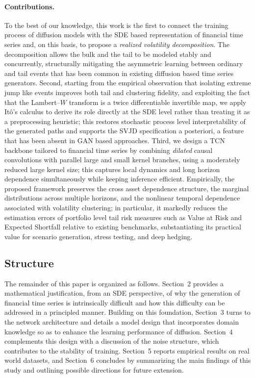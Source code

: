 \documentclass[sigconf,natbib=false]{acmart}
\begin{document}
\paragraph{Contributions.}
To the best of our knowledge, this work is the first to connect the training process of diffusion models with the SDE based representation of financial time series and, on this basis, to propose a \emph{realized volatility decomposition}. The decomposition allows the bulk and the tail to be modeled stably and concurrently, structurally mitigating the asymmetric learning between ordinary and tail events that has been common in existing diffusion based time series generators. Second, starting from the empirical observation that isolating extreme jump like events improves both tail and clustering fidelity, and exploiting the fact that the Lambert--$W$ transform is a twice differentiable invertible map, we apply It\^{o}'s calculus to derive its role directly at the SDE level rather than treating it as a preprocessing heuristic; this restores stochastic process level interpretability of the generated paths and supports the SVJD specification a posteriori, a feature that has been absent in GAN based approaches. Third, we design a TCN backbone tailored to financial time series by combining \emph{dilated} causal convolutions with parallel large and small kernel branches, using a moderately reduced large kernel size; this captures local dynamics and long horizon dependence simultaneously while keeping inference efficient. Empirically, the proposed framework preserves the cross asset dependence structure, the marginal distributions across multiple horizons, and the nonlinear temporal dependence associated with volatility clustering; in particular, it markedly reduces the estimation errors of portfolio level tail risk measures such as Value at Risk and Expected Shortfall relative to existing benchmarks, substantiating its practical value for scenario generation, stress testing, and deep hedging.



\subsection{Structure}

The remainder of this paper is organized as follows. Section~2 provides a mathematical justification, from an SDE perspective, of why the generation of financial time series is intrinsically difficult and how this difficulty can be addressed in a principled manner. Building on this foundation, Section~3 turns to the network architecture and details a model design that incorporates domain knowledge so as to enhance the learning performance of diffusion. Section~4 complements this design with a discussion of the noise structure, which contributes to the stability of training. Section~5 reports empirical results on real world datasets, and Section~6 concludes by summarizing the main findings of this study and outlining possible directions for future extension.
\end{document}
